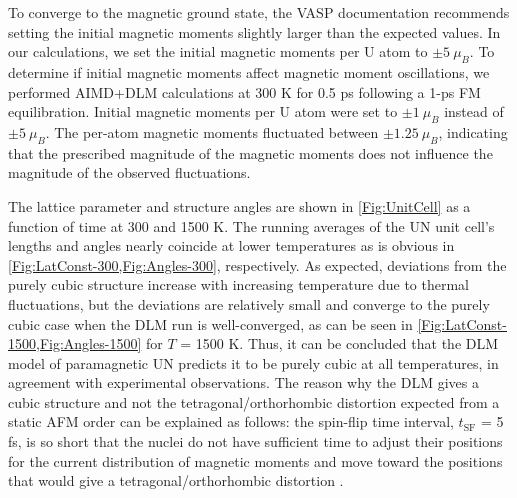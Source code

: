\documentclass[preprint, 12pt]{elsarticle}
\newcommand{\?}{\stackrel{?}{=}}
\begin{document}
To converge to the magnetic ground state, the VASP documentation recommends setting the initial magnetic moments slightly larger than the expected values. In our calculations, we set the initial magnetic moments per U atom to $\pm 5 \ \mu_B$. To determine if initial magnetic moments affect magnetic moment oscillations, we performed AIMD+DLM calculations at 300 K for 0.5 ps following a 1-ps FM equilibration. Initial magnetic moments per U atom were set to $\pm 1 \ \mu_B$ instead of $\pm 5 \ \mu_B$. The per-atom magnetic moments fluctuated between $\pm 1.25 \ \mu_B$, indicating that the prescribed magnitude of the magnetic moments does not influence the magnitude of the observed fluctuations.

The lattice parameter and structure angles are shown in \cref{Fig:UnitCell} as a function of time at 300 and 1500 K. 
The running averages of the UN unit cell's lengths and angles nearly coincide at lower temperatures as is obvious in \cref{Fig:LatConst-300,Fig:Angles-300}, respectively. As expected, deviations from the purely cubic structure increase with increasing temperature due to thermal fluctuations, but the deviations are relatively small and converge to the purely cubic case when the DLM run is well-converged, as can be seen in \cref{Fig:LatConst-1500,Fig:Angles-1500} for $T$ = 1500 K. Thus, it can be concluded that the DLM model of paramagnetic UN predicts it to be purely cubic at all temperatures, in agreement with experimental observations. The reason why the DLM gives a cubic structure and not the tetragonal/orthorhombic distortion expected from a static AFM order \cite{Claisse2016} can be explained as follows: the spin-flip time interval, $t_\mathrm{SF}$ = 5 fs, is so short that the nuclei do not have sufficient time to adjust their positions for the current distribution of magnetic moments and move toward the positions that would give a tetragonal/orthorhombic distortion \cite{Steneteg2012}.
\end{document}
